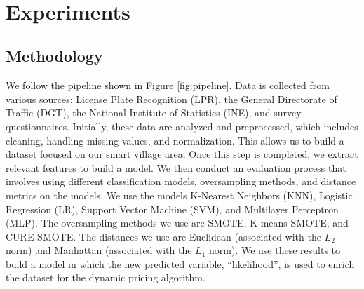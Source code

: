 \documentclass[12pt]{book}
\begin{document}
\begin{algorithm}[H]
{{            
        }
    }
    \\
\end{algorithm}


\section{Experiments} \label{sec:experimental}


\subsection{Methodology}
We follow the pipeline shown in Figure \ref{fig:pipeline}. Data is collected from various sources: License Plate Recognition (LPR), the General Directorate of Traffic (DGT), the National Institute of Statistics (INE), and survey questionnaires. Initially, these data are analyzed and preprocessed, which includes cleaning, handling missing values, and normalization. This allows us to build a dataset focused on our smart village area. Once this step is completed, we extract relevant features to build a model. We then conduct an evaluation process that involves using different classification models, oversampling methods, and distance metrics on the models. We use the models K-Nearest Neighbors (KNN), Logistic Regression (LR), Support Vector Machine (SVM), and Multilayer Perceptron (MLP). The oversampling methods we use are SMOTE, K-means-SMOTE, and CURE-SMOTE. The distances we use are Euclidean (associated with the $L_2$ norm) and Manhattan (associated with the $L_1$ norm). We use these results to build a model in which the new predicted variable, ``likelihood'', is used to enrich the dataset for the dynamic pricing algorithm. 
\end{document}
